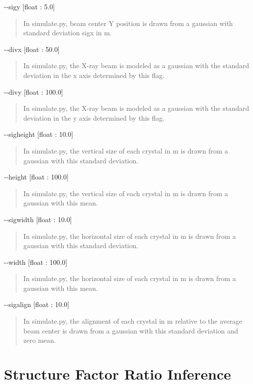 \documentclass{report}
\begin{document}
\noindent
-{}-sigy [float : 5.0]
\begin{quote}
    In simulate.py, beam center Y position is drawn from a gaussian with standard deviation sigx in \textmu m. 
\end{quote}


\noindent
-{}-divx [float : 50.0]
\begin{quote}
    In simulate.py, the X-ray beam is modeled as a gaussian with the standard deviation in the x axis determined by this flag.
\end{quote}

\noindent
-{}-divy [float : 100.0]
\begin{quote}
    In simulate.py, the X-ray beam is modeled as a gaussian with the standard deviation in the y axis determined by this flag.
\end{quote}

\noindent
-{}-sigheight [float : 10.0]
\begin{quote}
    In simulate.py, the vertical size of each crystal in \textmu m is drawn from a gaussian with this standard deviation.
\end{quote}

\noindent
-{}-height [float : 100.0]
\begin{quote}
    In simulate.py, the vertical size of each crystal in \textmu m is drawn from a gaussian with this mean. 
\end{quote}

\noindent
-{}-sigwidth [float : 10.0]
\begin{quote}
    In simulate.py, the horizontal size of each crystal in \textmu m is drawn from a gaussian with this standard deviation.
\end{quote}

\noindent
-{}-width [float : 100.0]
\begin{quote}
    In simulate.py, the horizontal size of each crystal in \textmu m is drawn from a gaussian with this mean. 
\end{quote}

\noindent
-{}-sigalign [float : 10.0]
\begin{quote}
    In simulate.py, the alignment of each crystal in \textmu m relative to the average beam center is drawn from a gaussian with this standard deviation and zero mean.
\end{quote}

\chapter{Structure Factor Ratio Inference}
\end{document}
